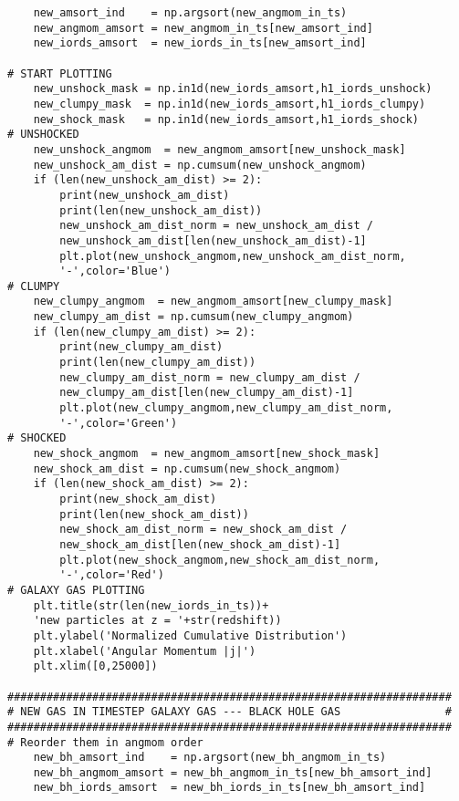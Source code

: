 \documentclass[12pt,headA,chapB]{fiskthesis}
\begin{document}
\begin{verbatim}
    new_amsort_ind    = np.argsort(new_angmom_in_ts)
    new_angmom_amsort = new_angmom_in_ts[new_amsort_ind]
    new_iords_amsort  = new_iords_in_ts[new_amsort_ind]

# START PLOTTING
    new_unshock_mask = np.in1d(new_iords_amsort,h1_iords_unshock)
    new_clumpy_mask  = np.in1d(new_iords_amsort,h1_iords_clumpy)
    new_shock_mask   = np.in1d(new_iords_amsort,h1_iords_shock)
# UNSHOCKED
    new_unshock_angmom  = new_angmom_amsort[new_unshock_mask]
    new_unshock_am_dist = np.cumsum(new_unshock_angmom)
    if (len(new_unshock_am_dist) >= 2):
        print(new_unshock_am_dist)
        print(len(new_unshock_am_dist))
        new_unshock_am_dist_norm = new_unshock_am_dist / 
        new_unshock_am_dist[len(new_unshock_am_dist)-1]
        plt.plot(new_unshock_angmom,new_unshock_am_dist_norm,
        '-',color='Blue')
# CLUMPY
    new_clumpy_angmom  = new_angmom_amsort[new_clumpy_mask]
    new_clumpy_am_dist = np.cumsum(new_clumpy_angmom)  
    if (len(new_clumpy_am_dist) >= 2):
        print(new_clumpy_am_dist)
        print(len(new_clumpy_am_dist))
        new_clumpy_am_dist_norm = new_clumpy_am_dist / 
        new_clumpy_am_dist[len(new_clumpy_am_dist)-1]
        plt.plot(new_clumpy_angmom,new_clumpy_am_dist_norm,
        '-',color='Green')
# SHOCKED    
    new_shock_angmom  = new_angmom_amsort[new_shock_mask]
    new_shock_am_dist = np.cumsum(new_shock_angmom)
    if (len(new_shock_am_dist) >= 2):
        print(new_shock_am_dist)
        print(len(new_shock_am_dist))
        new_shock_am_dist_norm = new_shock_am_dist / 
        new_shock_am_dist[len(new_shock_am_dist)-1]
        plt.plot(new_shock_angmom,new_shock_am_dist_norm,
        '-',color='Red')
# GALAXY GAS PLOTTING
    plt.title(str(len(new_iords_in_ts))+
    'new particles at z = '+str(redshift))
    plt.ylabel('Normalized Cumulative Distribution')
    plt.xlabel('Angular Momentum |j|')
    plt.xlim([0,25000])

####################################################################
# NEW GAS IN TIMESTEP GALAXY GAS --- BLACK HOLE GAS                #
####################################################################
# Reorder them in angmom order
    new_bh_amsort_ind    = np.argsort(new_bh_angmom_in_ts)
    new_bh_angmom_amsort = new_bh_angmom_in_ts[new_bh_amsort_ind]
    new_bh_iords_amsort  = new_bh_iords_in_ts[new_bh_amsort_ind]


\end{verbatim}
\end{document}

